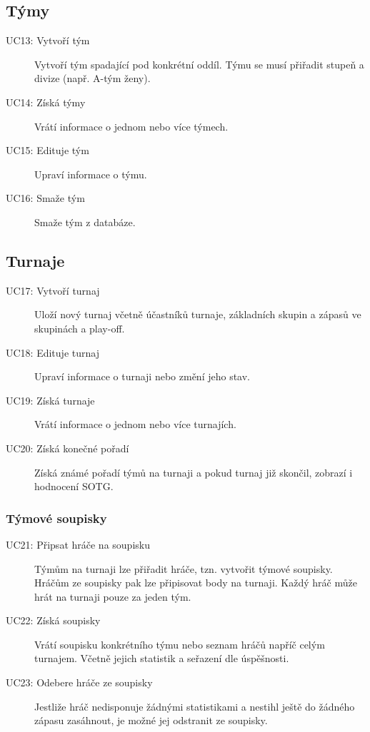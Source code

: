 \subsection*{Týmy}
  \begin{description}
    \item[UC13: Vytvoří tým]
      Vytvoří tým spadající pod konkrétní oddíl. Týmu se musí přiřadit stupeň a divize (např. A-tým ženy).
    \item[UC14: Získá týmy]
      Vrátí informace o jednom nebo více týmech.
    \item[UC15: Edituje tým]
      Upraví informace o týmu.
    \item[UC16: Smaže tým]
      Smaže tým z databáze.
  \end{description}

\subsection*{Turnaje}
  \begin{description}
    \item[UC17: Vytvoří turnaj]
      Uloží nový turnaj včetně účastníků turnaje, základních skupin a zápasů ve skupinách a play-off.
    \item[UC18: Edituje turnaj]
      Upraví informace o turnaji nebo změní jeho stav.
    \item[UC19: Získá turnaje]
      Vrátí informace o jednom nebo více turnajích.
    \item[UC20: Získá konečné pořadí]
      Získá známé pořadí týmů na turnaji a pokud turnaj již skončil, zobrazí i hodnocení SOTG.
  \end{description}

\subsubsection*{Týmové soupisky}
  \begin{description}
    \item[UC21: Připsat hráče na soupisku]
      Týmům na turnaji lze přiřadit hráče, tzn. vytvořit týmové soupisky. Hráčům ze soupisky
      pak lze připisovat body na turnaji. Každý hráč může hrát na turnaji pouze za jeden tým.
    \item[UC22: Získá soupisky]
      Vrátí soupisku konkrétního týmu nebo seznam hráčů napříč celým turnajem. Včetně jejich statistik a seřazení dle úspěšnosti.
    \item[UC23: Odebere hráče ze soupisky]
      Jestliže hráč nedisponuje žádnými statistikami a nestihl ještě do žádného zápasu zasáhnout, je možné jej odstranit ze soupisky.
  \end{description}

